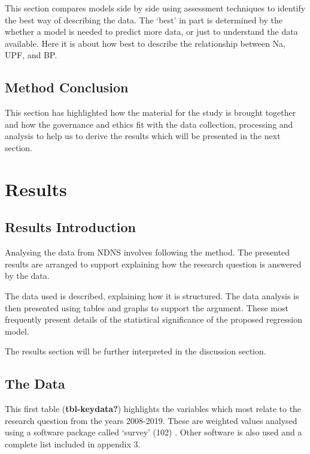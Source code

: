 \documentclass[
]{article}
\begin{document}
This section compares models side by side using assessment techniques to
identify the best way of describing the data. The `best' in part is
determined by the whether a model is needed to predict more data, or
just to understand the data available. Here it is about how best to
describe the relationship between Na, UPF, and BP.

\hypertarget{method-conclusion}{%
\subsection{Method Conclusion}\label{method-conclusion}}

This section has highlighted how the material for the study is brought
together and how the governance and ethics fit with the data collection,
processing and analysis to help us to derive the results which will be
presented in the next section.

\newpage

\hypertarget{results}{%
\section{Results}\label{results}}

\hypertarget{results-introduction}{%
\subsection{Results Introduction}\label{results-introduction}}

Analysing the data from NDNS involves following the method. The
presented results are arranged to support explaining how the research
question is answered by the data.

The data used is described, explaining how it is structured. The data
analysis is then presented using tables and graphs to support the
argument. These most frequently present details of the statistical
significance of the proposed regression model.

The results section will be further interpreted in the discussion
section.

\hypertarget{the-data-1}{%
\subsection{The Data}\label{the-data-1}}

This first table (\textbf{tbl-keydata?}) highlights the variables which
most relate to the research question from the years 2008-2019. These are
weighted values analysed using a software package called `survey' (102)
. Other software is also used and a complete list included in appendix
3.
\end{document}
